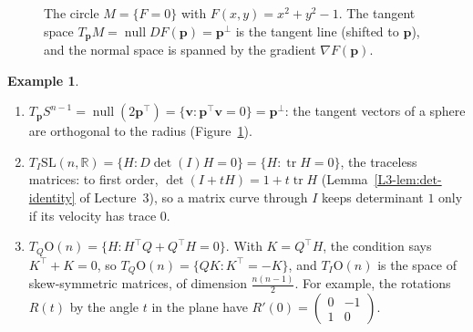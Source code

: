 \documentclass[11pt]{article}
\theoremstyle{definition}
\newtheorem{example}[definition]{Example}
\theoremstyle{plain}
\theoremstyle{remark}
\DeclareMathOperator{\Null}{null}
\DeclareMathOperator{\tr}{tr}
\begin{document}
\begin{figure}[ht]
    \centering
    \caption{The circle $M = \{F = 0\}$ with $F(x, y) = x^2 + y^2 - 1$. The tangent space $T_{\mathbf{p}}M = \Null DF(\mathbf{p}) = \mathbf{p}^\perp$ is the tangent line (shifted to $\mathbf{p}$), and the normal space is spanned by the gradient $\nabla F(\mathbf{p})$.}
    \label{fig:tangent}
\end{figure}

\begin{example}\label{ex:tangent-spaces}
    \begin{enumerate}
        \item $T_{\mathbf{p}}S^{n-1} = \Null(2\mathbf{p}^\top) = \{\mathbf{v} : \mathbf{p}^\top\mathbf{v} = 0\} = \mathbf{p}^\perp$: the tangent vectors of a sphere are orthogonal to the radius (Figure~\ref{fig:tangent}).
        \item $T_I \mathrm{SL}(n, \mathbb{R}) = \{H : D\det(I)H = 0\} = \{H : \tr H = 0\}$, the traceless matrices: to first order, $\det(I + tH) = 1 + t\tr H$ (Lemma~\ref{L3-lem:det-identity} of Lecture~3), so a matrix curve through $I$ keeps determinant $1$ only if its velocity has trace $0$.
        \item $T_Q \mathrm{O}(n) = \{H : H^\top Q + Q^\top H = 0\}$. With $K = Q^\top H$, the condition says $K^\top + K = 0$, so $T_Q \mathrm{O}(n) = \{QK : K^\top = -K\}$, and $T_I \mathrm{O}(n)$ is the space of skew-symmetric matrices, of dimension $\frac{n(n-1)}{2}$. For example, the rotations $R(t)$ by the angle $t$ in the plane have $R'(0) = \begin{pmatrix} 0 & -1 \\ 1 & 0 \end{pmatrix}$.
    \end{enumerate}
\end{example}
\end{document}
